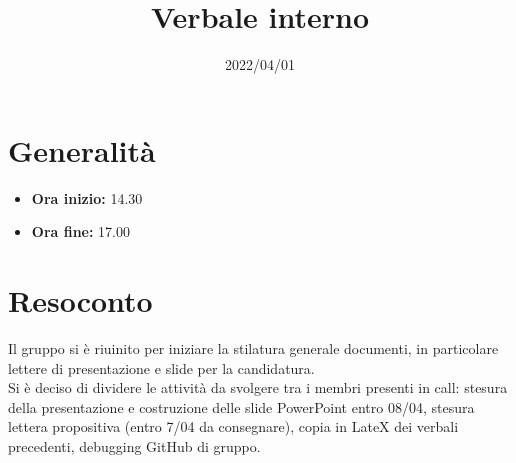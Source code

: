 \documentclass{classes/base}
\title{Verbale interno}
\date{2022/04/01}
\author{\marcob}
\renewcommand{\maketitle}{
    
}
\begin{document}
    \maketitle

    \section*{Generalità}
    \begin{itemize}
        \item \textbf{Ora inizio:} 14.30
        \item \textbf{Ora fine:} 17.00
    \end{itemize}
    
    \section*{Resoconto}
    Il gruppo si è riuinito per iniziare la stilatura generale documenti, in particolare lettere di presentazione e slide per la candidatura.\\
    Si è deciso di dividere le attività da svolgere tra i membri presenti in call: stesura della presentazione e costruzione delle slide PowerPoint entro 08/04, stesura lettera propositiva (entro 7/04 da consegnare), copia in LateX dei verbali precedenti, debugging GitHub di gruppo.
\end{document}

